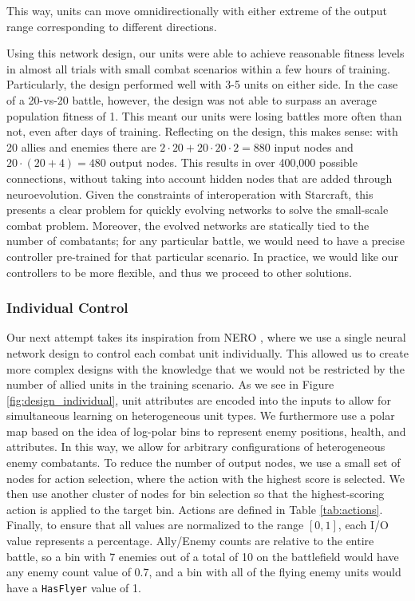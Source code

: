 \documentclass[a4paper]{article}
\begin{document}
This way, units can move omnidirectionally with either extreme of the output range corresponding to different directions.

Using this network design, our units were able to achieve reasonable fitness levels in almost all trials with small combat scenarios within a few hours of training. Particularly, the design performed well with 3-5 units on either side. In the case of a 20-vs-20 battle, however, the design was not able to surpass an average population fitness of 1. This meant our units were losing battles more often than not, even after days of training. Reflecting on the design, this makes sense: with 20 allies and enemies there are $2 \cdot 20 + 20\cdot 20 \cdot 2 = 880$ input nodes and $20 \cdot (20 + 4) = 480$ output nodes. This results in over 400,000 possible connections, without taking into account hidden nodes that are added through neuroevolution. Given the constraints of interoperation with Starcraft, this presents a clear problem for quickly evolving networks to solve the small-scale combat problem. Moreover, the evolved networks are statically tied to the number of combatants; for any particular battle, we would need to have a precise controller pre-trained for that particular scenario. In practice, we would like our controllers to be more flexible, and thus we proceed to other solutions.

\subsubsection{Individual Control}
\label{sec:individual_design}

Our next attempt takes its inspiration from NERO \cite{stanley:ieeetec05}, where we use a single neural network design to control each combat unit individually. This allowed us to create more complex designs with the knowledge that we would not be restricted by the number of allied units in the training scenario. As we see in Figure \ref{fig:design_individual}, unit attributes are encoded into the inputs to allow for simultaneous learning on heterogeneous unit types. We furthermore use a polar map based on the idea of log-polar bins to represent enemy positions, health, and attributes. In this way, we allow for arbitrary configurations of heterogeneous enemy combatants. To reduce the number of output nodes, we use a small set of nodes for action selection, where the action with the highest score is selected. We then use another cluster of nodes for bin selection so that the highest-scoring action is applied to the target bin. Actions are defined in Table \ref{tab:actions}. Finally, to ensure that all values are normalized to the range $[0,1]$, each I/O value represents a percentage. Ally/Enemy counts are relative to the entire battle, so a bin with 7 enemies out of a total of 10 on the battlefield would have any enemy count value of 0.7, and a bin with all of the flying enemy units would have a \texttt{HasFlyer} value of 1.
\end{document}
